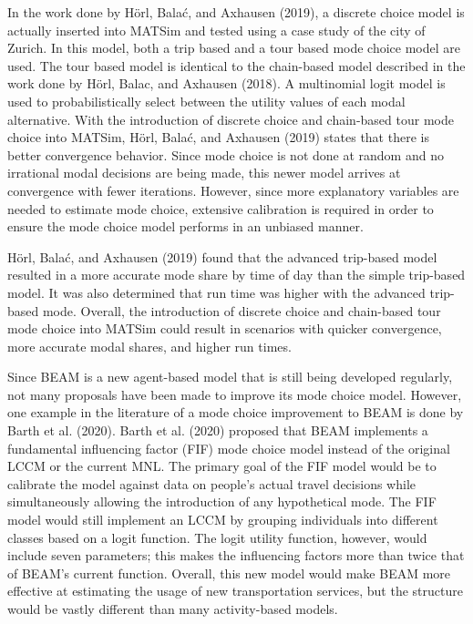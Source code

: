 \documentclass[12pt, oneside, openright]{byuthesis}
\begin{document}
In the work done by Hörl, Balać, and Axhausen (2019), a discrete choice model is actually inserted into MATSim and tested using a case study of the city of Zurich. In this model, both a trip based and a tour based mode choice model are used. The tour based model is identical to the chain-based model described in the work done by Hörl, Balac, and Axhausen (2018). A multinomial logit model is used to probabilistically select between the utility values of each modal alternative. With the introduction of discrete choice and chain-based tour mode choice into MATSim, Hörl, Balać, and Axhausen (2019) states that there is better convergence behavior. Since mode choice is not done at random and no irrational modal decisions are being made, this newer model arrives at convergence with fewer iterations. However, since more explanatory variables are needed to estimate mode choice, extensive calibration is required in order to ensure the mode choice model performs in an unbiased manner.

Hörl, Balać, and Axhausen (2019) found that the advanced trip-based model resulted in a more accurate mode share by time of day than the simple trip-based model. It was also determined that run time was higher with the advanced trip-based mode. Overall, the introduction of discrete choice and chain-based tour mode choice into MATSim could result in scenarios with quicker convergence, more accurate modal shares, and higher run times.

Since BEAM is a new agent-based model that is still being developed regularly, not many proposals have been made to improve its mode choice model. However, one example in the literature of a mode choice improvement to BEAM is done by Barth et al. (2020). Barth et al. (2020) proposed that BEAM implements a fundamental influencing factor (FIF) mode choice model instead of the original LCCM or the current MNL. The primary goal of the FIF model would be to calibrate the model against data on people's actual travel decisions while simultaneously allowing the introduction of any hypothetical mode. The FIF model would still implement an LCCM by grouping individuals into different classes based on a logit function. The logit utility function, however, would include seven parameters; this makes the influencing factors more than twice that of BEAM's current function. Overall, this new model would make BEAM more effective at estimating the usage of new transportation services, but the structure would be vastly different than many activity-based models.
\end{document}
